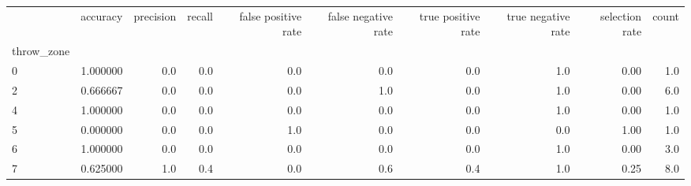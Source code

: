 \begin{tabular}{lrrrrrrrrr}
\toprule
{} &  accuracy &  precision &  recall &  false positive rate &  false negative rate &  true positive rate &  true negative rate &  selection rate &  count \\
throw\_zone &           &            &         &                      &                      &                     &                     &                 &        \\
\midrule
0          &  1.000000 &        0.0 &     0.0 &                  0.0 &                  0.0 &                 0.0 &                 1.0 &            0.00 &    1.0 \\
2          &  0.666667 &        0.0 &     0.0 &                  0.0 &                  1.0 &                 0.0 &                 1.0 &            0.00 &    6.0 \\
4          &  1.000000 &        0.0 &     0.0 &                  0.0 &                  0.0 &                 0.0 &                 1.0 &            0.00 &    1.0 \\
5          &  0.000000 &        0.0 &     0.0 &                  1.0 &                  0.0 &                 0.0 &                 0.0 &            1.00 &    1.0 \\
6          &  1.000000 &        0.0 &     0.0 &                  0.0 &                  0.0 &                 0.0 &                 1.0 &            0.00 &    3.0 \\
7          &  0.625000 &        1.0 &     0.4 &                  0.0 &                  0.6 &                 0.4 &                 1.0 &            0.25 &    8.0 \\
\bottomrule
\end{tabular}
